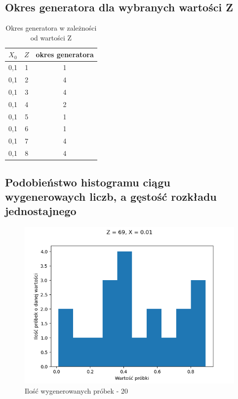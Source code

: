 \documentclass[12pt,a4paper]{article}
\begin{document}
  \subsection{Okres generatora dla wybranych wartości Z}

  \begin{table}[h!]
    \centering
    \begin{tabular}{ c | c | c }
      $X_0$ & $Z$ & okres generatora  \\ 
      \hline
      0,1 & 1 & 1  \\  
      0,1 & 2 & 4  \\  
      0,1 & 3 & 4  \\  
      0,1 & 4 & 2  \\  
      0,1 & 5 & 1  \\
      0,1 & 6 & 1  \\
      0,1 & 7 & 4  \\
      0,1 & 8 & 4 
    \end{tabular}
    \caption{Okres generatora w zależności od wartości Z}
    \label{table:1}
  \end{table}

  \subsection{Podobieństwo histogramu ciągu wygenerowaych liczb, a gęstość rozkładu jednostajnego}


  \begin{figure}[H]
    \centering
    \includegraphics[height=0.25\textheight]{figures/Figure_10.png}
    \caption{Ilość wygenerowanych próbek - 20}
    \label{fig:10}
  \end{figure}
\end{document}
